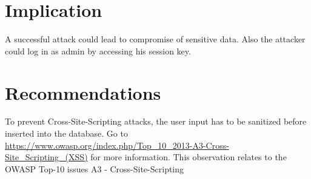 \section{Implication}
A successful attack could lead to compromise of sensitive data. Also the attacker could log in as admin by accessing his session key.

\section{Recommendations}
To prevent Cross-Site-Scripting attacks, the user input has to be sanitized before inserted into the database. Go to \url{https://www.owasp.org/index.php/Top_10_2013-A3-Cross-Site_Scripting_(XSS)} for more information. \newline
This observation relates to the OWASP Top-10 issues A3 - Cross-Site-Scripting

